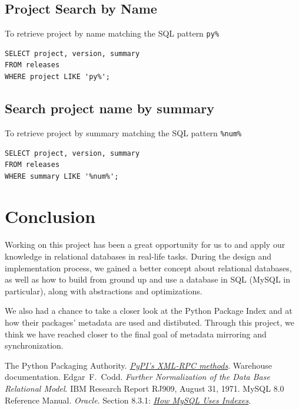 \documentclass[a4paper,12pt]{article}
\begin{document}
\subsection{Project Search by Name}
To retrieve project by name matching the SQL pattern \verb|py%|
\begin{verbatim}
SELECT project, version, summary
FROM releases
WHERE project LIKE 'py%';
\end{verbatim}

\subsection{Search project name by summary}
To retrieve project by summary matching the SQL pattern \verb|%num%|
\begin{verbatim}
SELECT project, version, summary
FROM releases
WHERE summary LIKE '%num%';
\end{verbatim}

\section{Conclusion}
Working on this project has been a great opportunity for us to and apply
our knowledge in relational databases in real-life tasks.
During the design and implementation process, we gained a better concept
about relational databases, as well as how to build from ground up and use
a database in SQL (MySQL in particular), along with abstractions
and optimizations.

We also had a chance to take a closer look at the Python Package Index
and at how their packages' metadata are used and distibuted.  Through
this project, we think we have reached closer to the final goal of
metadata mirroring and synchronization.

\begin{thebibliography}{69}
   The Python Packaging Authority.
    \href{https://warehouse.readthedocs.io/api-reference/xml-rpc}
         {\emph{PyPI’s XML-RPC methods}}.
    Warehouse documentation.
   Edgar~F.~Codd.
    \emph{Further Normalization of the Data Base Relational Model}.
    IBM Research Report RJ909, August 31, 1971.
   MySQL 8.0 Reference Manual.
    \emph{Oracle}.  Section 8.3.1:
    \href{https://dev.mysql.com/doc/refman/8.0/en/mysql-indexes.html}
         {\emph{How MySQL Uses Indexes}}.
\end{thebibliography}
\end{document}
